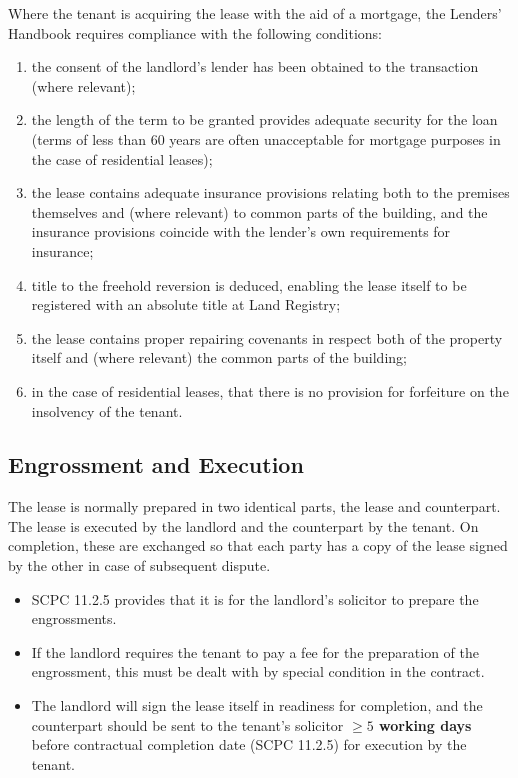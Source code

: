 \documentclass[
]{article}
\providecommand{\tightlist}{%
  \setlength{\itemsep}{0pt}\setlength{\parskip}{0pt}}
\begin{document}
Where the tenant is acquiring the lease with the aid of a mortgage, the
Lenders' Handbook requires compliance with the following conditions:

\begin{enumerate}
\def\labelenumi{\arabic{enumi}.}
\tightlist
\item
  the consent of the landlord's lender has been obtained to the
  transaction (where relevant);
\item
  the length of the term to be granted provides adequate security for
  the loan (terms of less than 60 years are often unacceptable for
  mortgage purposes in the case of residential leases);
\item
  the lease contains adequate insurance provisions relating both to the
  premises themselves and (where relevant) to common parts of the
  building, and the insurance provisions coincide with the lender's own
  requirements for insurance;
\item
  title to the freehold reversion is deduced, enabling the lease itself
  to be registered with an absolute title at Land Registry;
\item
  the lease contains proper repairing covenants in respect both of the
  property itself and (where relevant) the common parts of the building;
\item
  in the case of residential leases, that there is no provision for
  forfeiture on the insolvency of the tenant.
\end{enumerate}

\hypertarget{engrossment-and-execution}{%
\subsection{Engrossment and Execution}\label{engrossment-and-execution}}

The lease is normally prepared in two identical parts, the lease and
counterpart. The lease is executed by the landlord and the counterpart
by the tenant. On completion, these are exchanged so that each party has
a copy of the lease signed by the other in case of subsequent dispute.

\begin{itemize}
\tightlist
\item
  SCPC 11.2.5 provides that it is for the landlord's solicitor to
  prepare the engrossments.
\item
  If the landlord requires the tenant to pay a fee for the preparation
  of the engrossment, this must be dealt with by special condition in
  the contract.
\item
  The landlord will sign the lease itself in readiness for completion,
  and the counterpart should be sent to the tenant's solicitor
  \textbf{\(\geq 5\) working days} before contractual completion date
  (SCPC 11.2.5) for execution by the tenant.
\end{itemize}
\end{document}
